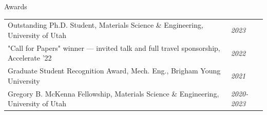 \documentclass{resume} %
\begin{document}
\begin{rSection}{Awards}
\renewcommand{\arraystretch}{1.5}
\begin{tabular}{m{14.2cm} m{2.1cm}}
{Outstanding Ph.D. Student, Materials Science \& Engineering, University of Utah} & {\em \hfill 2023} \\
{"Call for Papers" winner --- invited talk and full travel sponsorship, Accelerate '22} & {\em \hfill 2022} \\
{Graduate Student Recognition Award, Mech. Eng., Brigham Young University} & {\em \hfill 2021} \\
{Gregory B. McKenna Fellowship, Materials Science \& Engineering, University of Utah} & {\em \hfill 2020-2023} \\
\end{tabular}
\end{rSection}
\end{document}
